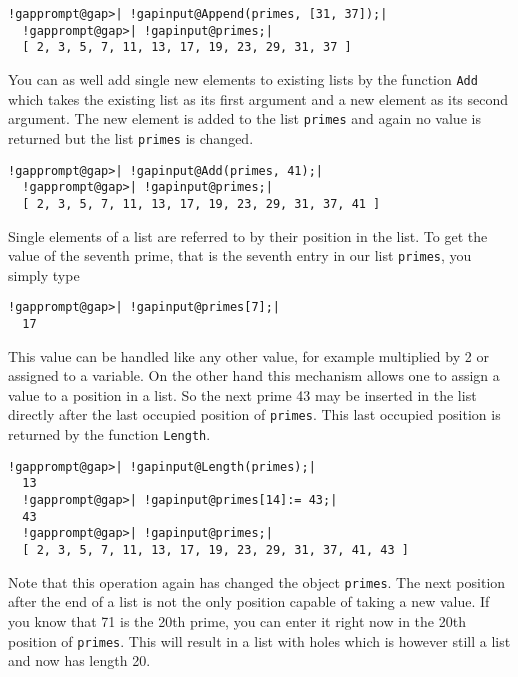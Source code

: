 \documentclass[a4paper,11pt]{report}
\begin{document}
{{ 
\begin{Verbatim}[commandchars=!@|,fontsize=\small,frame=single,label=Example]
  !gapprompt@gap>| !gapinput@Append(primes, [31, 37]);|
  !gapprompt@gap>| !gapinput@primes;|
  [ 2, 3, 5, 7, 11, 13, 17, 19, 23, 29, 31, 37 ]
\end{Verbatim}
 

 You can as well add single new elements to existing lists by the function \texttt{Add} which takes the existing list as its first argument and a new element as its
second argument. The new element is added to the list \texttt{primes} and again no value is returned but the list \texttt{primes} is changed. 

 
\begin{Verbatim}[commandchars=!@|,fontsize=\small,frame=single,label=Example]
  !gapprompt@gap>| !gapinput@Add(primes, 41);|
  !gapprompt@gap>| !gapinput@primes;|
  [ 2, 3, 5, 7, 11, 13, 17, 19, 23, 29, 31, 37, 41 ]
\end{Verbatim}
 

 Single elements of a list are referred to by their position in the list. To
get the value of the seventh prime, that is the seventh entry in our list \texttt{primes}, you simply type 

 
\begin{Verbatim}[commandchars=!@|,fontsize=\small,frame=single,label=Example]
  !gapprompt@gap>| !gapinput@primes[7];|
  17
\end{Verbatim}
 

 This value can be handled like any other value, for example multiplied by 2 or
assigned to a variable. On the other hand this mechanism allows one to assign
a value to a position in a list. So the next prime 43 may be inserted in the
list directly after the last occupied position of \texttt{primes}. This last occupied position is returned by the function \texttt{Length}. 

 
\begin{Verbatim}[commandchars=!@|,fontsize=\small,frame=single,label=Example]
  !gapprompt@gap>| !gapinput@Length(primes);|
  13
  !gapprompt@gap>| !gapinput@primes[14]:= 43;|
  43
  !gapprompt@gap>| !gapinput@primes;|
  [ 2, 3, 5, 7, 11, 13, 17, 19, 23, 29, 31, 37, 41, 43 ]
\end{Verbatim}
 

 Note that this operation again has changed the object \texttt{primes}. The next position after the end of a list is not the only position capable
of taking a new value. If you know that 71 is the 20th prime, you can enter it
right now in the 20th position of \texttt{primes}. This will result in a list with holes which is however still a list and now
has length 20. 

}}
\end{document}
